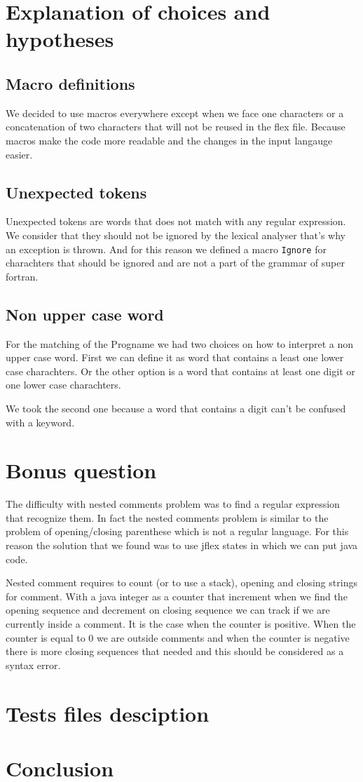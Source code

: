 \documentclass[12pt]{article}
\begin{document}
\section{Explanation of choices and hypotheses}

\subsection{Macro definitions}
We decided to use macros everywhere except when we face one characters or a concatenation of two characters
that will not be reused in the flex file. Because macros make the code more readable and the changes 
in the input langauge easier.

\subsection{Unexpected tokens}
Unexpected tokens are words that does not match with any regular expression. We consider that they
should not be ignored by the lexical analyser that's why an exception is thrown. And for this reason
we defined a macro \texttt{Ignore} for charachters that should be ignored and are not a part of 
the grammar of super fortran.

\subsection{Non upper case word}
For the matching of the Progname we had two choices on how to interpret a non upper case word.
First we can define it as word that contains a least one lower case charachters. Or the other option
is a word that contains at least one digit or one lower case charachters.

We took the second one because a word that contains a digit can't be confused with a keyword.



\section{Bonus question}
The difficulty with nested comments problem was to find a regular expression that recognize them.
In fact the nested comments problem is similar to the problem of opening/closing parenthese which is not a 
regular language. For this reason the solution that we found was to use jflex states in which we can put
java code.


Nested comment requires to count (or to use a stack), opening and closing strings for comment. 
With a java integer as a counter that increment when we find the opening sequence and decrement
on closing sequence we can track if we are
currently inside a comment. It is the case when the counter is positive. When the counter is equal to 0
we are outside comments and when the counter is negative there is more closing sequences that needed and this 
should be considered as a syntax error.

\section{Tests files desciption}


\section{Conclusion}
\end{document}

